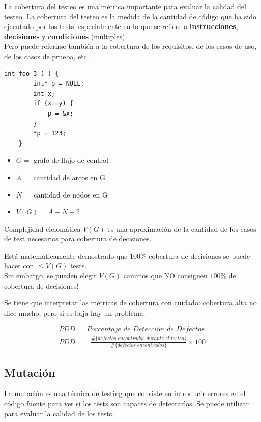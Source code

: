 La cobertura del testeo es una métrica importante para evaluar la calidad del testeo. La cobertura del testeo es la medida de la cantidad de código que ha sido ejecutado por los tests, especialmente en lo que se refiere a \textbf{instrucciones}, \textbf{decisiones} y \textbf{condiciones} (múltiples).\\
Pero puede referirse también a la cobertura de los requisitos, de los casos de uso, de los casos de prueba, etc.

\begin{lstlisting}[caption={Con 1 test donde \lstinline|x==y| se cubre todo el codigo, pero no todas las decisiones. En efecto, el defecto ocurre cuando \lstinline|x!=y|}]
	int foo_3 ( ) {
		int* p = NULL;
		int x;
		if (x==y) {
			p = &x;
		}
		*p = 123;
	}
\end{lstlisting}
\begin{itemize}
	\item $G =$ grafo de flujo de control
	\item $A =$ cantidad de arcos en G
	\item $N =$ cantidad de nodos en G
	\item $V(G) = A - N + 2$
\end{itemize}

Complejidad ciclomática $V(G)$ es una aproximación de la cantidad de los casos de test necesarios para cobertura de decisiones.

Está matemáticamente demostrado que $100\%$ cobertura de decisiones se puede hacer con $\leq V(G)$ tests.\\
Sin embargo, se pueden elegir $V(G)$ caminos que NO consiguen $100\%$ de cobertura de decisiones!

Se tiene que interpretar las métricas de cobertura con cuidado:
cobertura alta no dice mucho, pero si es baja hay un problema.

\begin{align}
	PDD &= \textit{Porcentaje de Detección de Defectos}\\
	PDD &= \frac{\#\{\textit{defectos encontrados durante el testeo}\}}{\#\{\textit{defectos encontrados}\}}\times 100
\end{align}
\subsection{Mutación}

La mutación es una técnica de testing que consiste en introducir errores en el código fuente para ver si los tests son capaces de detectarlos. Se puede utilizar para evaluar la calidad de los tests.

